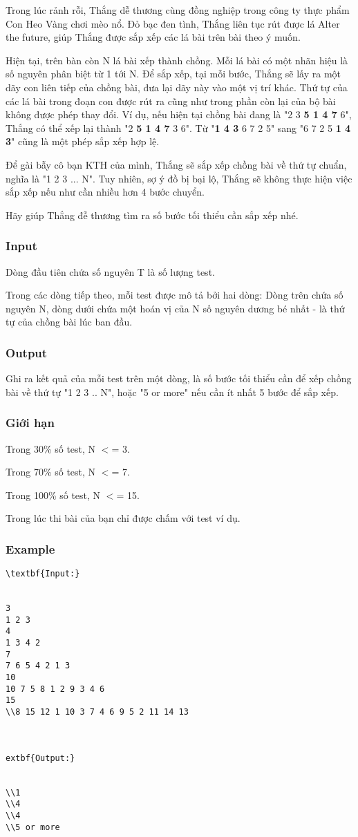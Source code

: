 

Trong lúc rảnh rỗi, Thắng dễ thương cùng đồng nghiệp trong công ty thực phẩm Con Heo Vàng chơi mèo nổ. Đỏ bạc đen tình, Thắng liên tục rút được lá Alter the future, giúp Thắng được sắp xếp các lá bài trên bài theo ý muốn.

Hiện tại, trên bàn còn N lá bài xếp thành chồng. Mỗi lá bài có một nhãn hiệu là số nguyên phân biệt từ 1 tới N. Để sắp xếp, tại mỗi bước, Thắng sẽ lấy ra một dãy con liên tiếp của chồng bài, đưa lại dãy này vào một vị trí khác. Thứ tự của các lá bài trong đoạn con được rút ra cũng như trong phần còn lại của bộ bài không được phép thay đổi. Ví dụ, nếu hiện tại chồng bài đang là "2 3 \textbf{5 1 4 7} 6", Thắng có thể xếp lại thành "2 \textbf{5 1 4 7 }3 6". Từ "\textbf{1 4 3} 6 7 2 5" sang "6 7 2 5 \textbf{1 4 3}" cũng là một phép sắp xếp hợp lệ.

Để gài bẫy cô bạn KTH của mình, Thắng sẽ sắp xếp chồng bài về thứ tự chuẩn, nghĩa là "1 2 3 ... N". Tuy nhiên, sợ ý đồ bị bại lộ, Thắng sẽ không thực hiện việc sắp xếp nếu như cần nhiều hơn 4 bước chuyển.

Hãy giúp Thắng đễ thương tìm ra số bước tối thiểu cần sắp xếp nhé.

\subsubsection{Input}

Dòng đầu tiên chứa số nguyên T là số lượng test.

Trong các dòng tiếp theo, mỗi test được mô tả bởi hai dòng: Dòng trên chứa số nguyên N, dòng dưới chứa một hoán vị của N số nguyên dương bé nhất - là thứ tự của chồng bài lúc ban đầu.

\subsubsection{Output}

Ghi ra kết quả của mỗi test trên một dòng, là số bước tối thiểu cần để xếp chồng bài về thứ tự "1 2 3 .. N", hoặc "5 or more" nếu cần ít nhất 5 bước để sắp xếp.

\subsubsection{Giới hạn}

Trong 30\% số test, N $<$= 3.

Trong 70\% số test, N $<$= 7.

Trong 100\% số test, N $<$= 15.

Trong lúc thi bài của bạn chỉ được chấm với test ví dụ.

\subsubsection{Example}
\begin{verbatim}
\textbf{Input:}


3
1 2 3
4
1 3 4 2
7
7 6 5 4 2 1 3
10
10 7 5 8 1 2 9 3 4 6
15
\\8 15 12 1 10 3 7 4 6 9 5 2 11 14 13



extbf{Output:}


\\1
\\4
\\4
\\5 or more \end{verbatim}

